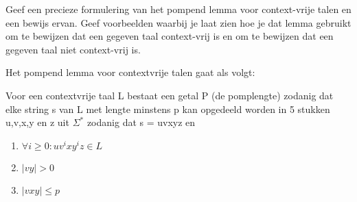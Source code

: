 \begin{question}
Geef een precieze formulering van het pompend lemma voor context-vrije talen en een bewijs ervan. Geef voorbeelden waarbij je laat zien hoe je dat lemma gebruikt om te bewijzen dat een gegeven taal context-vrij is en om te bewijzen dat een gegeven taal niet context-vrij is.
\end{question}

Het pompend lemma voor contextvrije talen gaat als volgt:
\begin{theorem}
Voor een contextvrije taal L bestaat een getal P (de pomplengte) zodanig dat elke string s van L met lengte minstens p kan opgedeeld worden in 5 stukken u,v,x,y en z uit $\Sigma^*$ zodanig dat s = uvxyz en 
\begin{enumerate}
\item $\forall i \geq 0 : uv^ixy^iz \in L$
\item $|vy| > 0$
\item $|vxy| \leq p$
\end{enumerate}
\end{theorem}

